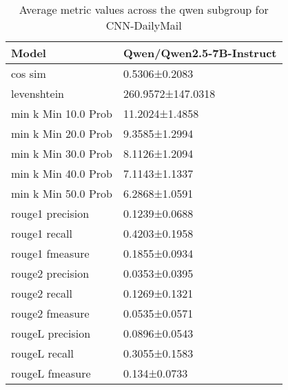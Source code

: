 \begin{table}
\caption{Average metric values across the qwen subgroup for CNN-DailyMail}
\label{tab:}
\begin{tabular}{ll}
\toprule
Model & Qwen/Qwen2.5-7B-Instruct \\
\midrule
cos sim & 0.5306±0.2083 \\
levenshtein & 260.9572±147.0318 \\
min k Min 10.0 Prob & 11.2024±1.4858 \\
min k Min 20.0 Prob & 9.3585±1.2994 \\
min k Min 30.0 Prob & 8.1126±1.2094 \\
min k Min 40.0 Prob & 7.1143±1.1337 \\
min k Min 50.0 Prob & 6.2868±1.0591 \\
rouge1 precision & 0.1239±0.0688 \\
rouge1 recall & 0.4203±0.1958 \\
rouge1 fmeasure & 0.1855±0.0934 \\
rouge2 precision & 0.0353±0.0395 \\
rouge2 recall & 0.1269±0.1321 \\
rouge2 fmeasure & 0.0535±0.0571 \\
rougeL precision & 0.0896±0.0543 \\
rougeL recall & 0.3055±0.1583 \\
rougeL fmeasure & 0.134±0.0733 \\
\bottomrule
\end{tabular}
\end{table}
